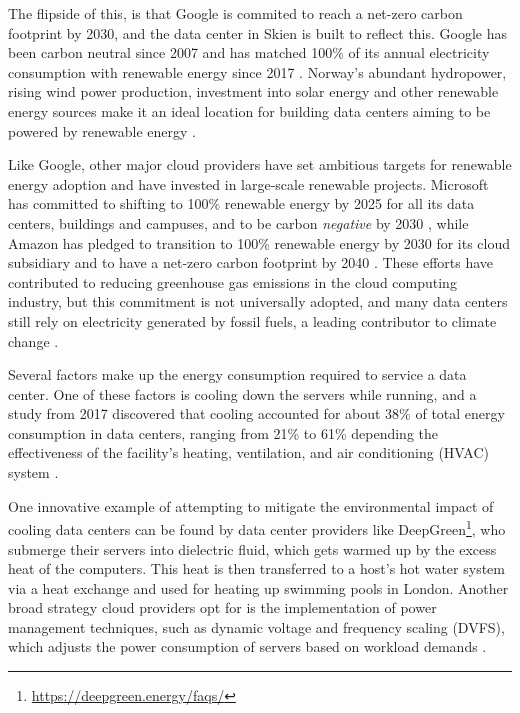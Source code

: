 \documentclass[
  table]{report}
\begin{document}

The flipside of this, is that Google is commited to reach a net-zero
carbon footprint by 2030, and the data center in Skien is built to
reflect this. Google has been carbon neutral since 2007 and has matched
100\% of its annual electricity consumption with renewable energy since
2017 \citep{googleTrackingOurCarbonFree}. Norway's abundant hydropower,
rising wind power production, investment into solar energy and other
renewable energy sources make it an ideal location for building data
centers aiming to be powered by renewable energy
\citep{norwegian-energyElectricityProduction2023}.

Like Google, other major cloud providers have set ambitious targets for
renewable energy adoption and have invested in large-scale renewable
projects. Microsoft has committed to shifting to 100\% renewable energy
by 2025 for all its data centers, buildings and campuses, and to be
carbon \emph{negative} by 2030 \citep{smithMicrosoftWillBe2020}, while
Amazon has pledged to transition to 100\% renewable energy by 2030 for
its cloud subsidiary and to have a net-zero carbon footprint by 2040
\citep{amazonClimatePledge2019}. These efforts have contributed to
reducing greenhouse gas emissions in the cloud computing industry, but
this commitment is not universally adopted, and many data centers still
rely on electricity generated by fossil fuels, a leading contributor to
climate change \citep{mytton2020}.


Several factors make up the energy consumption required to service a
data center. One of these factors is cooling down the servers while
running, and a study from 2017 discovered that cooling accounted for
about 38\% of total energy consumption in data centers, ranging from
21\% to 61\% depending the effectiveness of the facility's heating,
ventilation, and air conditioning (HVAC) system
\citep{niReviewAirConditioning2017}.

One innovative example of attempting to mitigate the environmental
impact of cooling data centers can be found by data center providers
like DeepGreen\footnote{\url{https://deepgreen.energy/faqs/}}, who
submerge their servers into dielectric fluid, which gets warmed up by
the excess heat of the computers. This heat is then transferred to a
host's hot water system via a heat exchange and used for heating up
swimming pools in London. Another broad strategy cloud providers opt for
is the implementation of power management techniques, such as dynamic
voltage and frequency scaling (DVFS), which adjusts the power
consumption of servers based on workload demands
\citep{beloglazovEnergyawareResourceAllocation2012}.
\end{document}
